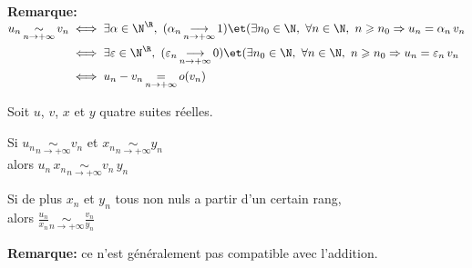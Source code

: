 \documentclass[12pt,twoside,a4paper]{article}
\begin{document}
		\begin{flushleft}
			\textbf{Remarque:}\\
			$\begin{aligned}
				u_n\mathop{\sim}\limits_{n\rightarrow+\infty}v_n &\iff\exists\alpha\in\N^\R,\ (\alpha_n\mathop{\longrightarrow}\limits_{n\rightarrow+\infty}1)\et(\exists n_0\in\N,\ \forall n\in\N,\ n\geqslant n_0\Rightarrow u_n=\alpha_n\,v_n\\
				&\iff\exists\varepsilon\in\N^\R,\ (\varepsilon_n\mathop{\longrightarrow}\limits_{n\rightarrow+\infty}0)\et(\exists n_0\in\N,\ \forall n\in\N,\ n\geqslant n_0\Rightarrow u_n=\varepsilon_n\,v_n\\
				&\iff u_n-v_n\mathop{=}\limits_{n\rightarrow+\infty}o(v_n)
			\end{aligned}$
		\end{flushleft}
		\newpage
		\begin{prop}
			Soit $u$, $v$, $x$ et $y$ quatre suites r\'eelles.
			\begin{liste}
				\item Si $u_n\mathop{\sim}\limits_{n\rightarrow+\infty}v_n$ et $x_n\mathop{\sim}\limits_{n\rightarrow+\infty}y_n$\\
					alors $u_n\,x_n\mathop{\sim}\limits_{n\rightarrow+\infty}v_n\,y_n$
				\item Si de plus $x_n$ et $y_n$ tous non nuls a partir d'un certain rang,\\
				alors $\frac{u_n}{x_n}\mathop{\sim}\limits_{n\rightarrow+\infty}\frac{v_n}{y_n}$
			\end{liste}
		\end{prop}
		\begin{flushleft}
			\textbf{Remarque:} ce n'est g\'en\'eralement pas compatible avec l'addition.
		\end{flushleft}
\end{document}
